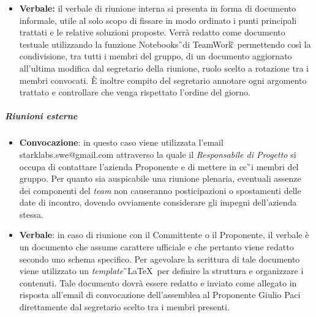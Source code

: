 \begin{itemize}
\item \textbf{Verbale:} il verbale di riunione interna si presenta in forma di documento 
informale, utile al solo scopo di fissare in modo ordinato i punti principali trattati e le relative soluzioni proposte. Verrà redatto come documento testuale utilizzando la funzione Notebooks\G\ di 
TeamWork\G\, permettendo così la condivisione, tra tutti i membri del 
gruppo, di un documento aggiornato all'ultima modifica dal segretario della riunione, ruolo scelto a rotazione tra i membri convocati. È inoltre compito del segretario annotare ogni argomento trattato e controllare che venga rispettato 
l'ordine del giorno.

\end{itemize}

\subparagraph{Riunioni esterne}
\begin{itemize}
\item \textbf{Convocazione}: in questo caso viene utilizzata l'email starklabs.swe@gmail.com attraverso la quale il \textit{Responsabile di Progetto} si occupa di contattare l'azienda Proponente e di mettere in cc\G\ i membri del gruppo. Per quanto sia auspicabile una riunione plenaria, eventuali assenze 
dei componenti del \textit{team} non causeranno posticipazioni o spostamenti delle 
date di incontro, dovendo ovviamente considerare gli impegni dell'azienda stessa.

\item \textbf{Verbale}: in caso di riunione con il Committente o il Proponente, il verbale è un 
documento che assume carattere ufficiale e che pertanto viene redatto secondo uno schema 
specifico.
Per agevolare la scrittura di tale documento viene utilizzato un \textit{template}\G\ 
\LaTeX\ per definire la struttura e organizzare i contenuti. Tale documento 
dovrà essere redatto e inviato come allegato in risposta all'email di convocazione 
dell'assemblea al Proponente Giulio Paci direttamente dal segretario scelto tra i membri presenti. 
\end{itemize}


